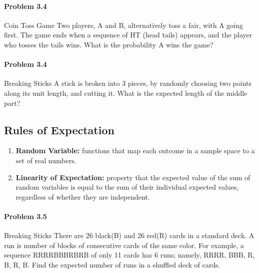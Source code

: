 \documentclass{article}
\begin{document}
\paragraph{Problem 3.4} Coin Toss Game
\newline
\newline
Two players, A and B, alternatively toss a fair, with A going first. The game ends when a sequence of HT (head tails) appears, and the player who tosses the tails wins. What is the probability A wins the game?
\newline
\newline
\paragraph{Problem 3.4} Breaking Sticks
\newline
\newline
A stick is broken into 3 pieces, by randomly choosing two points along its unit length, and cutting it. What is the expected length of the middle part?
\newline
\newline
\subsection{Rules of Expectation}
\begin{enumerate}
    \item{\textbf{Random Variable:} functions that map each outcome in a sample space to a set of real numbers.}

    \item{\textbf{Linearity of Expectation:} property that the expected value of the sum of random variables is equal to the sum of their individual expected values, regardless of whether they are independent.}
\end{enumerate}

\newline
\newline

\paragraph{Problem 3.5} Breaking Sticks
\newline
\newline
There are 26 black(B) and 26 red(R) cards in a standard deck. A run is number of blocks of consecutive cards of the same color. For example, a sequence RRRRBBBRBRB of only 11 cards has 6 runs; namely, RRRR, BBB, R, B, R, B. Find the expected number of runs in a shuffled deck of cards.
\newline
\newline
\end{document}
